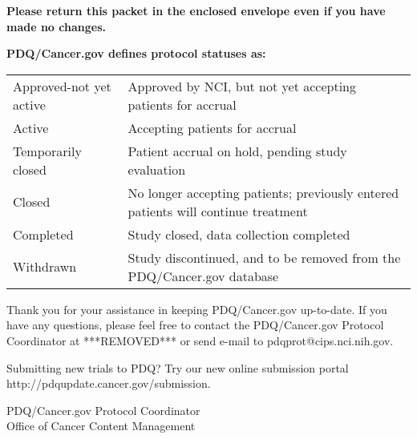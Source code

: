 \documentclass[letterpaper,12pt]{letter}
\begin{document}
\textbf{Please return this packet in the enclosed envelope even if you have
    made no changes.}

\textbf{PDQ/Cancer.gov defines protocol statuses as:}

\begin{longtable}{p{2in}p{4in}}
Approved-not yet active & Approved by NCI, but not yet accepting
                          patients for accrual \\
Active                  & Accepting patients for accrual \\
Temporarily closed      & Patient accrual on hold, pending study evaluation \\
Closed                  & No longer accepting patients; previously entered
                          patients will continue treatment \\
Completed               & Study closed, data collection completed \\
Withdrawn               & Study discontinued, and to be removed from
                          the PDQ/Cancer.gov database
\end{longtable}

Thank you for your assistance in keeping PDQ/Cancer.gov up-to-date.  If you
have any questions, please feel free to contact the PDQ/Cancer.gov Protocol
Coordinator at ***REMOVED*** or send e-mail to pdqprot@cips.nci.nih.gov.

Submitting new trials to PDQ?
Try our new online submission portal
http://pdqupdate.cancer.gov/submission.

\vspace{12pt}

PDQ/Cancer.gov Protocol Coordinator \\
Office of Cancer Content Management

\vfill
\end{document}
